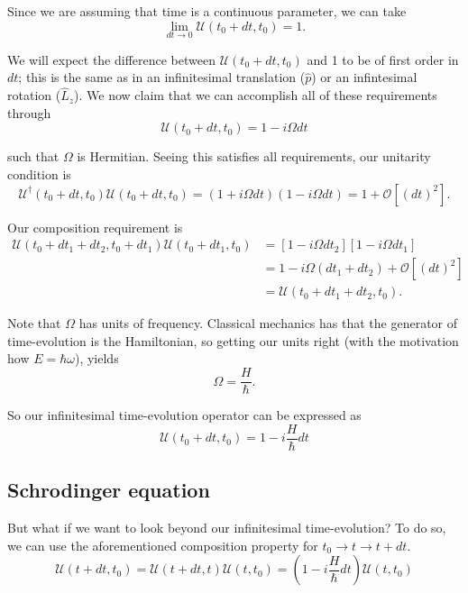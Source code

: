 \documentclass[12pt]{revtex4-2}
\begin{document}
Since we are assuming that time is a continuous parameter, we can take 
\begin{equation}
    \lim_{dt\to0} \mathcal{U}(t_0 + dt , t_0) = 1.
\end{equation}

We will expect the difference between $\mathcal{U}(t_0+dt,t_0)$ and 1 to be of first order in $dt$; this is the same as in an infinitesimal translation ($\hat{p}$) or an infintesimal rotation ($\hat{L}_z$).  We now claim that we can accomplish all of these requirements through 
\begin{equation}
    \mathcal{U}(t_0+dt,t_0) = 1 - i\Omega dt 
\end{equation}

such that $\Omega$ is Hermitian.  Seeing this satisfies all requirements, our unitarity condition is
\begin{equation}
    \mathcal{U}^\dagger(t_0+dt,t_0)\mathcal{U}(t_0+dt,t_0) = (1 + i\Omega dt )(1 - i\Omega dt ) = 1 + \mathcal{O}[(dt)^2].
\end{equation}

Our composition requirement is 
\begin{align}
    \mathcal{U}(t_0+dt_1+dt_2,t_0+dt_1)\mathcal{U}(t_0+dt_1,t_0) &= [1 - i\Omega dt_2][1 - i\Omega dt_1] \\
    &= 1 - i\Omega (dt_1 + dt_2) + \mathcal{O}[(dt)^2] \\
    &= \mathcal{U}(t_0+dt_1+dt_2,t_0).
\end{align}

Note that $\Omega$ has units of frequency.  Classical mechanics has that the generator of time-evolution is the Hamiltonian, so getting our units right (with the motivation how $E=\hbar\omega$), yields
\begin{equation}
    \Omega = \frac{H}{\hbar}.
\end{equation}

So our infinitesimal time-evolution operator can be expressed as 
\begin{equation}
    \boxed{ \mathcal{U}(t_0 + dt,t_0) = 1 - i\frac{H}{\hbar}dt }
\end{equation}

\subsection{Schrodinger equation}
But what if we want to look beyond our infinitesimal time-evolution?  To do so, we can use the aforementioned composition property for $t_0 \to t \to t+dt$.
\begin{equation}
    \mathcal{U}(t+dt,t_0) = \mathcal{U}(t+dt,t)\mathcal{U}(t,t_0) = \left( 1 - i\frac{H}{\hbar}dt \right)\mathcal{U}(t,t_0)
\end{equation}
\end{document}
